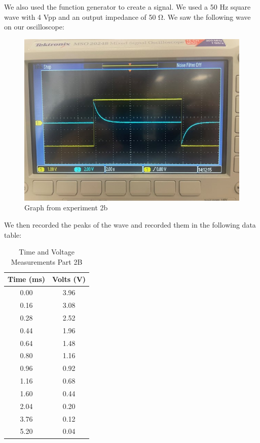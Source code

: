 \documentclass[11pt]{article}
\begin{document}
    We also used the function generator to create a signal. We used a 50 Hz square wave with 4 Vpp and an output impedance of 50 Ω. We saw the following wave on our oscilloscope:

    \begin{figure}
        \centering
        \includegraphics[width=1.0\linewidth]{resources/images/rlc part 2b graph}
        \caption{Graph from experiment 2b}
    \end{figure}

    We then recorded the peaks of the wave and recorded them in the following data table:

    \begin{table}[h]
        \centering
        \caption{Time and Voltage Measurements Part 2B}
        \begin{tabular}{cc}
            \toprule
            \textbf{Time (ms)} & \textbf{Volts (V)} \\
            \midrule
            0.00 & 3.96 \\
            0.16 & 3.08 \\
            0.28 & 2.52 \\
            0.44 & 1.96 \\
            0.64 & 1.48 \\
            0.80 & 1.16 \\
            0.96 & 0.92 \\
            1.16 & 0.68 \\
            1.60 & 0.44 \\
            2.04 & 0.20 \\
            3.76 & 0.12 \\
            5.20 & 0.04 \\
            \bottomrule
        \end{tabular}
    \end{table}
\end{document}
